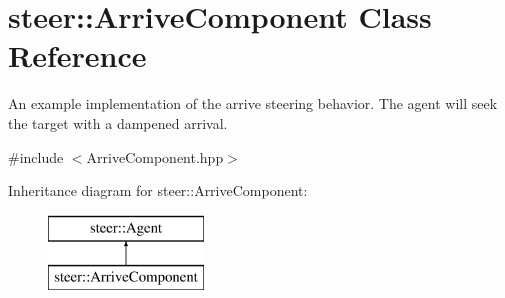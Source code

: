 \hypertarget{classsteer_1_1_arrive_component}{\section{steer\-:\-:Arrive\-Component Class Reference}
\label{classsteer_1_1_arrive_component}
}


An example implementation of the arrive steering behavior. The agent will seek the target with a dampened arrival.  




{\ttfamily \#include $<$Arrive\-Component.\-hpp$>$}

Inheritance diagram for steer\-:\-:Arrive\-Component\-:\begin{figure}[H]
\begin{center}
\leavevmode
\includegraphics[height=2.000000cm]{classsteer_1_1_arrive_component}
\end{center}
\end{figure}
